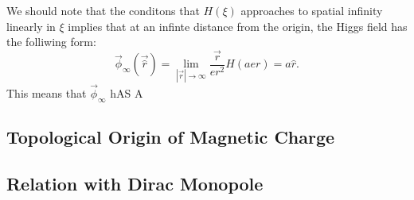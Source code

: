  We should note that the conditons that $H(\xi)$ approaches to spatial infinity linearly in $\xi$ implies that at an infinte distance from the origin, the Higgs field has the folliwing form: 
 \begin{equation}
 \vec{\phi}_{\infty}(\vec{\hat{r}}) = \lim_{|\vec{r}| \to \infty } \frac{\vec{r}}{er^2}H(aer) = a \hat{r}.
 \end{equation}
 This means that $\vec{\phi}_{\infty}$ hAS A 


\subsection{Topological Origin of Magnetic Charge}
\label{sect:top}
\subsection{Relation with Dirac Monopole}